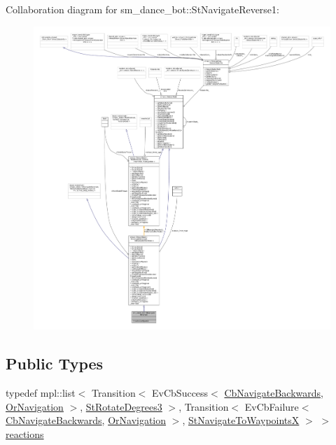 Collaboration diagram for sm\+\_\+dance\+\_\+bot\+:\+:St\+Navigate\+Reverse1\+:
\nopagebreak
\begin{figure}[H]
\begin{center}
\leavevmode
\includegraphics[width=350pt]{structsm__dance__bot_1_1StNavigateReverse1__coll__graph}
\end{center}
\end{figure}
\subsection*{Public Types}
\begin{DoxyCompactItemize}
\item 
typedef mpl\+::list$<$ Transition$<$ Ev\+Cb\+Success$<$ \hyperlink{classcl__move__base__z_1_1CbNavigateBackwards}{Cb\+Navigate\+Backwards}, \hyperlink{classsm__dance__bot_1_1OrNavigation}{Or\+Navigation} $>$, \hyperlink{structsm__dance__bot_1_1StRotateDegrees3}{St\+Rotate\+Degrees3} $>$, Transition$<$ Ev\+Cb\+Failure$<$ \hyperlink{classcl__move__base__z_1_1CbNavigateBackwards}{Cb\+Navigate\+Backwards}, \hyperlink{classsm__dance__bot_1_1OrNavigation}{Or\+Navigation} $>$, \hyperlink{structsm__dance__bot_1_1StNavigateToWaypointsX}{St\+Navigate\+To\+WaypointsX} $>$ $>$ \hyperlink{structsm__dance__bot_1_1StNavigateReverse1_a24a5443646b3a4d633743a4670945f3b}{reactions}
\end{DoxyCompactItemize}
